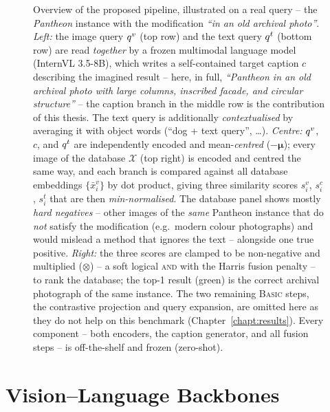 \begin{figure}[H]
\centering
\resizebox{\textwidth}{!}{}
\caption[Overview of the proposed retrieval pipeline.]{Overview of the
  proposed pipeline, illustrated on a real query -- the \emph{Pantheon}
  instance with the modification \emph{``in an old archival photo''}.
  \textit{Left:} the image query $q^{v}$ (top row) and the text query $q^{t}$
  (bottom row) are read \emph{together} by a frozen multimodal language model
  (InternVL 3.5-8B), which writes a self-contained target caption $c$
  describing the imagined result -- here, in full, \emph{``Pantheon in an old
  archival photo with large columns, inscribed facade, and circular
  structure''} -- the caption branch in the middle row is the contribution of
  this thesis. The text query is additionally
  \emph{contextualised} by averaging it with object words (``dog + text
  query'', \dots).
  \textit{Centre:} $q^{v}$, $c$, and $q^{t}$ are independently encoded and
  mean-\emph{centred} ($-\boldsymbol{\mu}$); every image of the database
  $\mathcal{X}$ (top right) is encoded and centred the same way, and each
  branch is compared against all database embeddings $\{\bar{x}^v_i\}$ by dot
  product, giving three similarity scores $s^v_i$, $s^c_i$, $s^t_i$ that are
  then \emph{min-normalised}. The database panel shows mostly \emph{hard
  negatives} -- other images of the \emph{same} Pantheon instance that do
  \emph{not} satisfy the modification (e.g.\ modern colour photographs) and
  would mislead a method that ignores the text -- alongside one true positive.
  \textit{Right:} the three scores are clamped to be non-negative and
  multiplied ($\otimes$) -- a soft logical \textsc{and} with the Harris fusion
  penalty -- to rank the database; the top-1 result (green) is the correct
  archival photograph of the same instance. The two remaining \textsc{Basic}
  steps, the contrastive projection and query expansion, are omitted here as
  they do not help on this benchmark (Chapter~\ref{chapt:results}). Every
  component -- both encoders, the caption generator, and all fusion steps -- is
  off-the-shelf and frozen (zero-shot).\label{fig:pipeline}}
\end{figure}

\section{Vision--Language Backbones}\label{sect:method_backbones}

